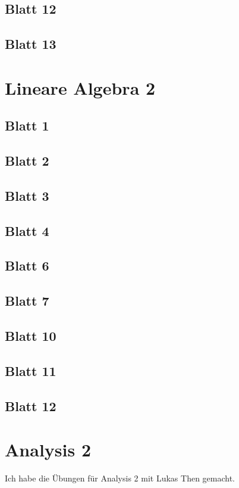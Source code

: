 \documentclass{tuftebook}
\numberwithin{Theorem}{chapter}
\theoremstyle{definition}
\theoremstyle{definition}
\begin{document}
\section{Blatt 12}

\section{Blatt 13}


\chapter{Lineare Algebra 2}
\section{Blatt 1}

\section{Blatt 2}

\section{Blatt 3}

\section{Blatt 4}

\section{Blatt 6}

\section{Blatt 7}

\section{Blatt 10}

\section{Blatt 11}

\section{Blatt 12}


\chapter{Analysis 2}
Ich habe die Übungen für Analysis 2 mit Lukas Then gemacht.
\end{document}

